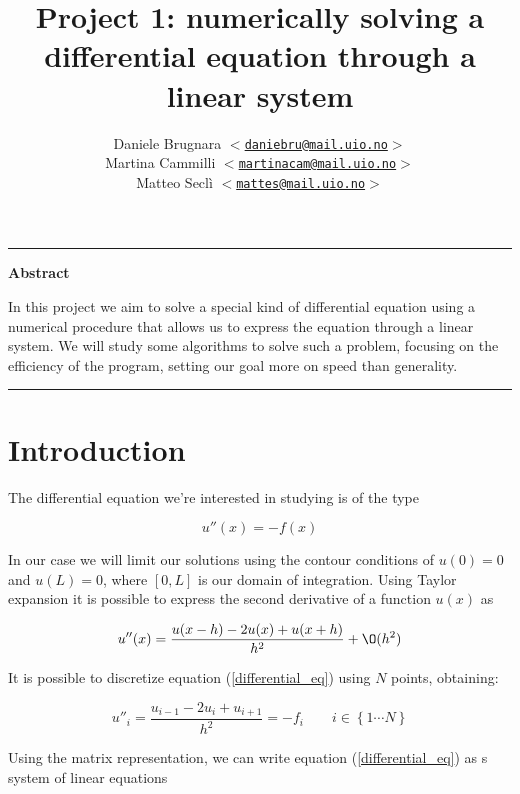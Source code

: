\documentclass {article}
\author{
\normalsize Daniele Brugnara \texttt{$<$\href{mailto:daniebru@mail.uio.no}
{daniebru@mail.uio.no}$>$}\\
\normalsize Martina Cammilli \texttt{$<$\href{mailto:martinacam@mail.uio.no}
{martinacam@mail.uio.no}$>$}\\
\normalsize Matteo Seclì \texttt{$<$\href{mailto:mattes@mail.uio.no}
{mattes@mail.uio.no}$>$}
}
\title{\textbf{Project 1: numerically solving a differential equation through a linear system}}
\begin{document}
\maketitle

\hrule
\begin{center}
	\large\textbf{Abstract}
	\medskip\\
	\begin{minipage}[c][][c]{0.8\textwidth}
		\small{
			In this project we aim to solve a special kind of differential equation using a numerical procedure that allows us to express the equation through a linear system. We will study some algorithms to solve such a problem, focusing on the efficiency of the program, setting our goal more on speed than generality.
			}
	\end{minipage}
\end{center}
\medskip
\hrule

\section{Introduction}

The differential equation we're interested in studying is of the type

\begin{equation}
	u''(x)= - f(x)
	\label{differential_eq}
\end{equation}

In our case we will limit our solutions using the contour conditions of $u(0)=0$ and $u(L)=0$, where $[0, L]$ is our domain of integration.
Using Taylor expansion it is possible to express the second derivative of a function $u(x)$ as

\begin{equation}
	u''(x)= \frac{u(x-h)-2 u(x)+u(x+h)}{h^2}+ \O (h^2)
\end{equation}

It is possible to discretize equation (\ref{differential_eq}) using $N$ points, obtaining:

$$u''_i= \frac{u_{i-1}-2 u_i+u_{i+1}}{h^2}=-f_i \quad \quad i \in \left\lbrace 1 \cdots N\right\rbrace$$

Using the matrix representation, we can write equation (\ref{differential_eq}) as s system of linear equations
\end{document}
